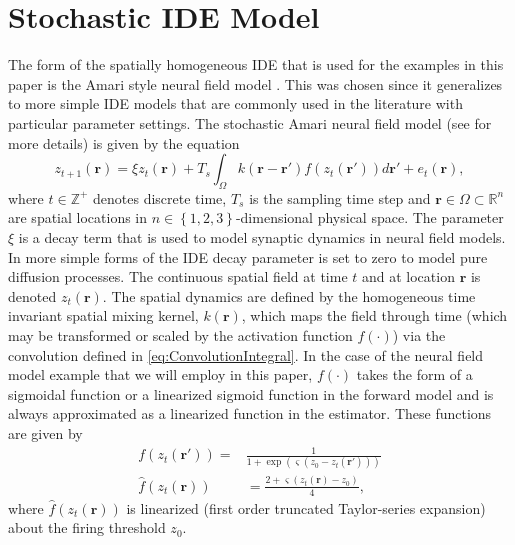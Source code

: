 \documentclass[10pt,twocolumn,twoside]{IEEEtran}
\begin{document}
\section{Stochastic IDE Model}
The form of the spatially homogeneous IDE that is used for the examples in this paper is the Amari style neural field model \cite{Amari1977}.
This was chosen since it generalizes to more simple IDE models that are commonly used in the literature with particular parameter settings.
The stochastic Amari neural field model (see \cite{Freestone2011} for more details) is given by the equation  
\begin{equation}
 z_{t+1}\left(\mathbf{r}\right)=\xi z_t(\mathbf{r})+T_s\int_{\Omega}k\left(\mathbf{r}-\mathbf{r}'\right)f(z_{t}\left(\mathbf{r}'\right))d\mathbf{r}'+e_{t}\left(\mathbf{r}\right),
\label{eq:ConvolutionIntegral}
\end{equation}
where $t\in \mathbb{Z}^{+} $ denotes discrete time, $T_s$ is the sampling time step and $\mathbf{r} \in \Omega \subset \mathbb{R}^{n}$ are spatial locations in $n \in \left\lbrace 1,2,3 \right\rbrace $-dimensional physical space.
The parameter $\xi$ is a decay term that is used to model synaptic dynamics in neural field models.
In more simple forms of the IDE decay parameter is set to zero to model pure diffusion processes.
The continuous spatial field at time $t$ and at location $\mathbf r$ is denoted $z_t\left(\mathbf r\right)$.
The spatial dynamics are defined by the homogeneous time invariant spatial mixing kernel, $k\left(\mathbf{r}\right)$, which maps the field through time (which may be transformed or scaled by the activation function $f(\cdot)$) via the convolution defined in \eqref{eq:ConvolutionIntegral}.
In the case of the neural field model example that we will employ in this paper, $f(\cdot)$ takes the form of a sigmoidal function or a linearized sigmoid function  in the forward model and is always approximated as a linearized function in the estimator.
These functions are given by
\begin{align}
	 f\left( z_t\left( \mathbf{r}'\right) \right) =& \frac{1}{1 + \exp \left( \varsigma \left( z_0 - z_t\left(\mathbf{r}'\right) \right) \right)} \label{ActivationFunction}\\
	\hat{f}(z_t\left(\mathbf{r}\right)) &=\frac{2 + \varsigma(z_t\left(\mathbf{r}\right) - z_0)}{4} \label{LinearizedActivationFunction}, 
\end{align}
where $\hat{f}(z_t\left(\mathbf{r}\right))$ is linearized (first order
truncated Taylor-series expansion) about the firing threshold $z_0$.
\end{document}
